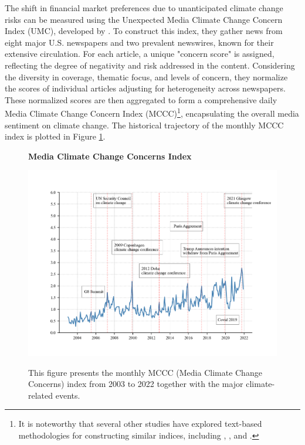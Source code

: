 \documentclass[12pt]{article}
\begin{document}
The shift in financial market preferences due to unanticipated climate change risks can be measured using the Unexpected Media Climate Change Concern Index (UMC), developed by \citet{ardia2022climate}. To construct this index, they gather news from eight major U.S. newspapers and two prevalent newswires, known for their extensive circulation. For each article, a unique "concern score" is assigned, reflecting the degree of negativity and risk addressed in the content. Considering the diversity in coverage, thematic focus, and levels of concern, they normalize the scores of individual articles adjusting for heterogeneity across newspapers. These normalized scores are then aggregated to form a comprehensive daily Media Climate Change Concern Index (MCCC)\footnote{It is noteworthy that several other studies have explored text-based methodologies for constructing similar indices, including \cite{engle2020hedging}, \cite{kapfhammer2020climate}, and \cite{faccini2021climate}.}, encapsulating the overall media sentiment on climate change. The historical trajectory of the monthly MCCC index is plotted in Figure \ref{fig: mccc}.

\begin{figure}[!ht]
\centering
\caption{\textbf{Media Climate Change Concerns Index}}
\includegraphics{graphics/mccc.png}
\label{fig: mccc}
\caption*{\footnotesize{This figure presents the monthly MCCC (Media Climate Change Concerns) index from 2003 to 2022 together with the major climate-related events.}}
\end{figure} 
\end{document}
